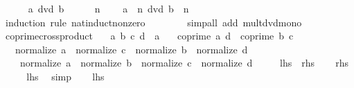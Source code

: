 \begin{isabellebody}
\isanewline
\ \ \ \ \isamarkupfalse%
\ {\isachardoublequoteopen}a\ dvd\ b{\isachardoublequoteclose}\isanewline
\ \ \ \ \isamarkupfalse%
\ {\isacartoucheopen}n\ {\isachargreater}{\kern0pt}\ {}{\isacartoucheclose}\ \isamarkupfalse%
\ {\isachardoublequoteopen}a\ {\isacharcircum}{\kern0pt}\ n\ dvd\ b\ {\isacharcircum}{\kern0pt}\ n{\isachardoublequoteclose}\isanewline
\ \ \ \ \ \ \isamarkupfalse%
\ {\isacharparenleft}{\kern0pt}induction\ rule{\isacharcolon}{\kern0pt}\ nat{\isacharunderscore}{\kern0pt}induct{\isacharunderscore}{\kern0pt}non{\isacharunderscore}{\kern0pt}zero{\isacharparenright}{\kern0pt}\isanewline
\ \ \ \ \ \ \ \ {\isacharparenleft}{\kern0pt}simp{\isacharunderscore}{\kern0pt}all\ add{\isacharcolon}{\kern0pt}\ mult{\isacharunderscore}{\kern0pt}dvd{\isacharunderscore}{\kern0pt}mono{\isacharparenright}{\kern0pt}\isanewline
\ \ \isamarkupfalse%
\isanewline
{}\isamarkupfalse%
%
\endisatagproof
{\isafoldproof}%
%
\isadelimproof
\isanewline
%
\endisadelimproof
\isanewline
{}\isamarkupfalse%
\ coprime{\isacharunderscore}{\kern0pt}crossproduct{\isacharcolon}{\kern0pt}\isanewline
\ \ \ a\ b\ c\ d\ {\isacharcolon}{\kern0pt}{\isacharcolon}{\kern0pt}\ {\isacharprime}{\kern0pt}a\isanewline
\ \ \ {\isachardoublequoteopen}coprime\ a\ d{\isachardoublequoteclose}\ \ {\isachardoublequoteopen}coprime\ b\ c{\isachardoublequoteclose}\isanewline
\ \ \ {\isachardoublequoteopen}normalize\ a\ {\isacharasterisk}{\kern0pt}\ normalize\ c\ {\isacharequal}{\kern0pt}\ normalize\ b\ {\isacharasterisk}{\kern0pt}\ normalize\ d\ {\isasymlongleftrightarrow}\isanewline
\ \ \ \ normalize\ a\ {\isacharequal}{\kern0pt}\ normalize\ b\ {\isasymand}\ normalize\ c\ {\isacharequal}{\kern0pt}\ normalize\ d{\isachardoublequoteclose}\isanewline
\ \ \ \ {\isacharparenleft}{\kern0pt}\ {\isachardoublequoteopen}{\isacharquery}{\kern0pt}lhs\ {\isasymlongleftrightarrow}\ {\isacharquery}{\kern0pt}rhs{\isachardoublequoteclose}{\isacharparenright}{\kern0pt}\isanewline
%
\isadelimproof
%
\endisadelimproof
%
\isatagproof
{}\isamarkupfalse%
\isanewline
\ \ \isamarkupfalse%
\ {\isacharquery}{\kern0pt}rhs\isanewline
\ \ \isamarkupfalse%
\ \isamarkupfalse%
\ {\isacharquery}{\kern0pt}lhs\ \isamarkupfalse%
\ simp\isanewline
{}\isamarkupfalse%
\isanewline
\ \ \isamarkupfalse%
\ {\isacharquery}{\kern0pt}lhs\isanewline

\end{isabellebody}
